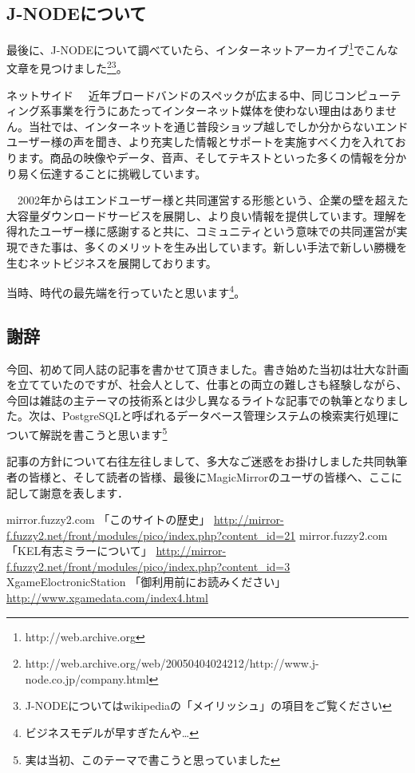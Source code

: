 \subsection{J-NODEについて}

最後に、J-NODEについて調べていたら、インターネットアーカイブ\footnote{http://web.archive.org}でこんな文章を見つけました\footnote{http://web.archive.org/web/20050404024212/http://www.j-node.co.jp/company.html}\footnote{J-NODEについてはwikipediaの「メイリッシュ」の項目をご覧ください}。

\begin{screen}
ネットサイド
　近年ブロードバンドのスペックが広まる中、同じコンピューティング系事業を行うにあたってインターネット媒体を使わない理由はありません。当社では、インターネットを通じ普段ショップ越しでしか分からないエンドユーザー様の声を聞き、より充実した情報とサポートを実施すべく力を入れております。商品の映像やデータ、音声、そしてテキストといった多くの情報を分かり易く伝達することに挑戦しています。

　2002年からはエンドユーザー様と共同運営する形態という、企業の壁を超えた大容量ダウンロードサービスを展開し、より良い情報を提供しています。理解を得れたユーザー様に感謝すると共に、コミュニティという意味での共同運営が実現できた事は、多くのメリットを生み出しています。新しい手法で新しい勝機を生むネットビジネスを展開しております。

\end{screen}

当時、時代の最先端を行っていたと思います\footnote{ビジネスモデルが早すぎたんや…}。

\subsection{謝辞}
今回、初めて同人誌の記事を書かせて頂きました。書き始めた当初は壮大な計画を立てていたのですが、社会人として、仕事との両立の難しさも経験しながら、今回は雑誌の主テーマの技術系とは少し異なるライトな記事での執筆となりました。次は、PostgreSQLと呼ばれるデータベース管理システムの検索実行処理について解説を書こうと思います\footnote{実は当初、このテーマで書こうと思っていました}

記事の方針について右往左往しまして、多大なご迷惑をお掛けしました共同執筆者の皆様と、そして読者の皆様、最後にMagicMirrorのユーザの皆様へ、ここに記して謝意を表します．

\begin{thebibliography}{9} 
  mirror.fuzzy2.com 「このサイトの歴史」 \url{http://mirror-f.fuzzy2.net/front/modules/pico/index.php?content_id=21}
  mirror.fuzzy2.com 「KEL有志ミラーについて」 \url{http://mirror-f.fuzzy2.net/front/modules/pico/index.php?content_id=3}
  XgameEloctronicStation 「御利用前にお読みください」 \url{http://www.xgamedata.com/index4.html}
\end{thebibliography}
  